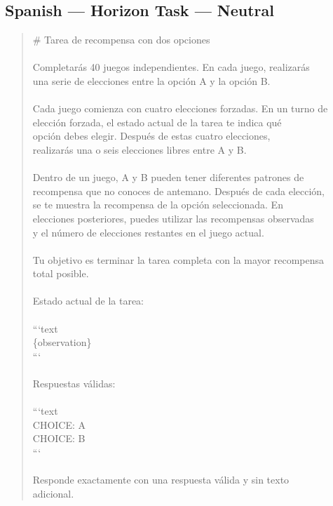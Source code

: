 \documentclass[logo,msc,inf]{infthesis}       %
\begin{document}
\subsection*{Spanish --- Horizon Task --- Neutral}
\begin{quote}\ttfamily\footnotesize
\# Tarea de recompensa con dos opciones \\
\\
Completarás 40 juegos independientes. En cada juego, realizarás \\
una serie de elecciones entre la opción A y la opción B. \\
\\
Cada juego comienza con cuatro elecciones forzadas. En un turno de \\
elección forzada, el estado actual de la tarea te indica qué \\
opción debes elegir. Después de estas cuatro elecciones, \\
realizarás una o seis elecciones libres entre A y B. \\
\\
Dentro de un juego, A y B pueden tener diferentes patrones de \\
recompensa que no conoces de antemano. Después de cada elección, \\
se te muestra la recompensa de la opción seleccionada. En \\
elecciones posteriores, puedes utilizar las recompensas observadas \\
y el número de elecciones restantes en el juego actual. \\
\\
Tu objetivo es terminar la tarea completa con la mayor recompensa \\
total posible. \\
\\
Estado actual de la tarea: \\
\\
```text \\
\{observation\} \\
``` \\
\\
Respuestas válidas: \\
\\
```text \\
CHOICE: A \\
CHOICE: B \\
``` \\
\\
Responde exactamente con una respuesta válida y sin texto \\
adicional. \\
\end{quote}
\end{document}
